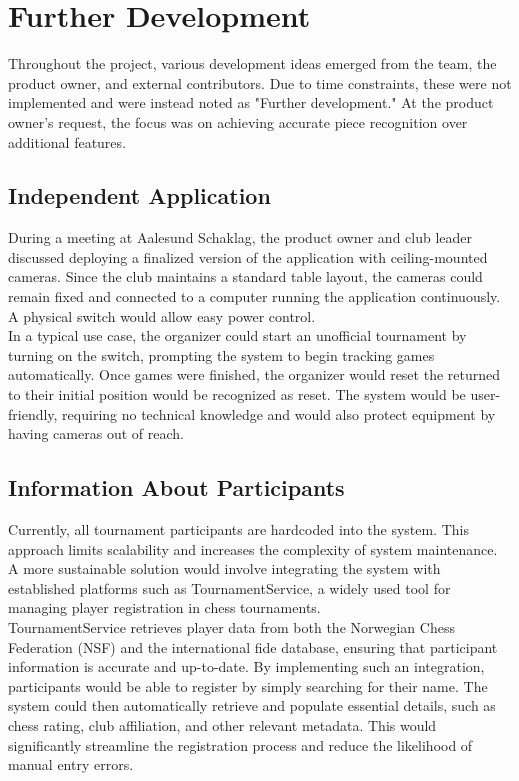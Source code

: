 

\section{Further Development}
Throughout the project, various development ideas emerged from the team, the product owner, and external contributors. Due to time constraints, these were not implemented and were instead noted as "Further development." At the product owner's request, the focus was on achieving accurate piece recognition over additional features.

\subsection{Independent Application}
During a meeting at Aalesund Schaklag, the product owner and club leader discussed deploying a finalized version of the application with ceiling-mounted cameras. Since the club maintains a standard table layout, the cameras could remain fixed and connected to a computer running the application continuously. A physical switch would allow easy power control. \\

In a typical use case, the organizer could start an unofficial tournament by turning on the switch, prompting the system to begin tracking games automatically. Once games were finished, the organizer would reset the returned to their initial position would be recognized as reset. The system would be user-friendly, requiring no technical knowledge and would also protect equipment by having cameras out of reach.

\subsection{Information About Participants}
Currently, all tournament participants are hardcoded into the system. This approach limits scalability and increases the complexity of system maintenance. A more sustainable solution would involve integrating the system with established platforms such as TournamentService, a widely used tool for managing player registration in chess tournaments. \\

TournamentService retrieves player data from both the Norwegian Chess Federation (NSF) and the international \gls{fide} database, ensuring that participant information is accurate and up-to-date.
By implementing such an integration, participants would be able to register by simply searching for their name. The system could then automatically retrieve and populate essential details, such as chess rating, club affiliation, and other relevant metadata. This would significantly streamline the registration process and reduce the likelihood of manual entry errors. \\

